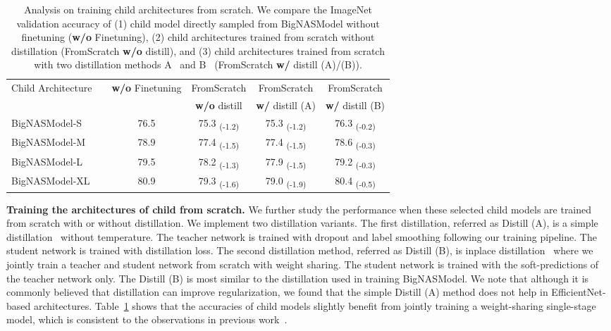 \documentclass[runningheads]{llncs}
\begin{document}
\begin{table}[ht]
\centering
\vspace{-5mm}
\caption{Analysis on training child architectures from scratch. We compare the ImageNet validation accuracy of (1) child model directly sampled from BigNASModel without finetuning (\textbf{w/o} Finetuning), (2) child architectures trained from scratch without distillation (FromScratch \textbf{w/o} distill), and (3) child architectures trained from scratch with two distillation methods A~\cite{hinton2015distilling} and B~\cite{yu2019universally} (FromScratch \textbf{w/} distill (A)/(B)).}
\begin{tabular}{@{}l c | c | c | c | c @{}} \toprule
Child Architecture & & \textbf{w/o} Finetuning & FromScratch & FromScratch & FromScratch \\
& & & \textbf{w/o} distill & \textbf{w/} distill (A) & \textbf{w/} distill (B)\\
\midrule
BigNASModel-S && 76.5 & 75.3 \textsubscript{\color{red} (-1.2)} & 75.3 \textsubscript{\color{red} (-1.2)} & 76.3 \textsubscript{\color{red} (-0.2)} \\
BigNASModel-M && 78.9 & 77.4 \textsubscript{\color{red} (-1.5)} & 77.4 \textsubscript{\color{red} (-1.5)} & 78.6 \textsubscript{\color{red} (-0.3)}\\
BigNASModel-L && 79.5 & 78.2 \textsubscript{\color{red} (-1.3)} & 77.9 \textsubscript{\color{red} (-1.5)} & 79.2 \textsubscript{\color{red} (-0.3)}\\
BigNASModel-XL && 80.9 & 79.3 \textsubscript{\color{red} (-1.6)} & 79.0 \textsubscript{\color{red} (-1.9)} & 80.4 \textsubscript{\color{red} (-0.5)}\\
\bottomrule
\end{tabular}
\label{tabs:fromscratch}
\vspace{-5mm}
\end{table} 
\noindent\hspace{\parindent}
\textbf{Training the architectures of child from scratch.} We further study the performance when these selected child models are trained from scratch with or without distillation. We implement two distillation variants. The first distillation, referred as Distill (A), is a simple distillation~\cite{hinton2015distilling} without temperature. The teacher network is trained with dropout and label smoothing following our training pipeline. The student network is trained with distillation loss. The second distillation method, referred as Distill (B), is inplace distillation~\cite{yu2019universally} where we jointly train a teacher and student network from scratch with weight sharing. The student network is trained with the soft-predictions of the teacher network only. The Distill (B) is most similar to the distillation used in training BigNASModel. We note that although it is commonly believed that distillation can improve regularization, we found that the simple Distill (A) method does not help in EfficientNet-based architectures. Table~\ref{tabs:fromscratch} shows that the accuracies of child models slightly benefit from jointly training a weight-sharing single-stage model, which is consistent to the observations in previous work~\cite{yu2019universally}. 
\end{document}
